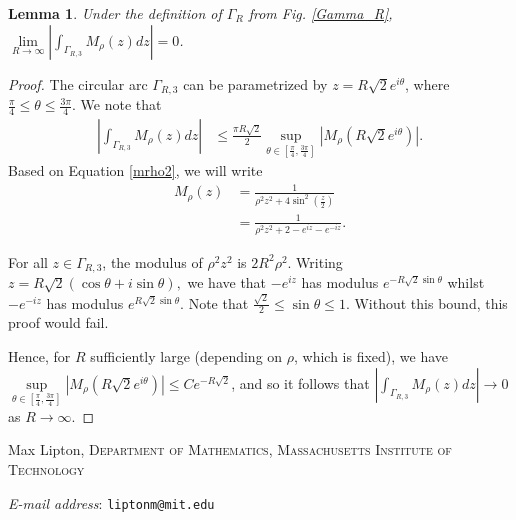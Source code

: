 \documentclass{amsart}
\makeatletter
\theoremstyle{plain}
\numberwithin{theorem}{section}
\newtheorem{lemma}[theorem]{Lemma}
\theoremstyle{definition}
\theoremstyle{remark}
\theoremstyle{brakets}
\newcommand{\Addresses}{{%
  \bigskip

  Max Lipton, \textsc{Department of Mathematics, Massachusetts Institute of Technology}\par\nopagebreak
  \textit{E-mail address}: \texttt{liptonm@mit.edu}


}}
\makeatother
\begin{document}
\begin{lemma}
    Under the definition of $\Gamma_R$ from Fig. \ref{Gamma_R}, $ \lim\limits_{R \to \infty} \left| \int_{\Gamma_{R,3}} M_{\rho}(z)dz \right| =  0$.
\end{lemma}
\begin{proof}
The circular arc $\Gamma_{R,3}$ can be parametrized by $z = R\sqrt{2}e^{i\theta}$, where $\frac{\pi}{4} \leq \theta \leq \frac{3\pi}{4}$. We note that
\begin{align*}
    \left| \int_{\Gamma_{R,3}} M_{\rho}(z)dz \right| &\leq \frac{\pi R \sqrt{2}}{2} \sup\limits_{\theta \in [\frac{\pi}{4},\frac{3\pi}{4}]} |M_\rho(R\sqrt{2}e^{i\theta})|.
\end{align*}
\noindent Based on Equation \eqref{mrho2}, we will write
\begin{align*}
    M_\rho(z) &= \frac{1}{\rho^2z^2 + 4\sin^2(\frac{z}{2})} \\
    &= \frac{1}{\rho^2z^2 + 2 - e^{iz} - e^{-iz}}.
\end{align*}

For all $z \in \Gamma_{R,3}$, the modulus of $\rho^2z^2$ is $2R^2\rho^2$. Writing $z = R\sqrt{2}(\cos \theta + i \sin\theta),$ we have that $-e^{iz}$ has modulus $e^{-R\sqrt{2}\sin\theta}$ whilst $-e^{-iz}$ has modulus $e^{R\sqrt{2}\sin \theta}$. Note that $\frac{\sqrt{2}}{2} \leq \sin \theta \leq 1$. Without this bound, this proof would fail.

Hence, for $R$ sufficiently large (depending on $\rho$, which is fixed), we have $\sup\limits_{\theta \in [\frac{\pi}{4},\frac{3\pi}{4}]} |M_\rho(R\sqrt{2}e^{i\theta})| \leq Ce^{-R\sqrt{2}}$, and so it follows that $\left| \int_{\Gamma_{R,3}} M_{\rho}(z)dz \right| \to 0$ as $R \to \infty$. \end{proof}




\Addresses
\end{document}
